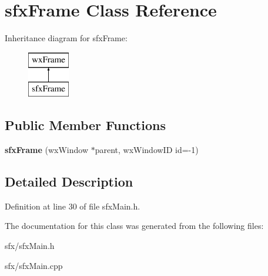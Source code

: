\hypertarget{classsfx_frame}{\section{sfx\-Frame Class Reference}
\label{classsfx_frame}
}
Inheritance diagram for sfx\-Frame\-:\begin{figure}[H]
\begin{center}
\leavevmode
\includegraphics[height=2.000000cm]{classsfx_frame}
\end{center}
\end{figure}
\subsection*{Public Member Functions}
\begin{DoxyCompactItemize}
\item 
\hypertarget{classsfx_frame_a7a333991300687c3d7c47f8dce9c697c}{{\bfseries sfx\-Frame} (wx\-Window $\ast$parent, wx\-Window\-I\-D id=-\/1)}\label{classsfx_frame_a7a333991300687c3d7c47f8dce9c697c}

\end{DoxyCompactItemize}


\subsection{Detailed Description}


Definition at line 30 of file sfx\-Main.\-h.



The documentation for this class was generated from the following files\-:\begin{DoxyCompactItemize}
\item 
sfx/sfx\-Main.\-h\item 
sfx/sfx\-Main.\-cpp\end{DoxyCompactItemize}
